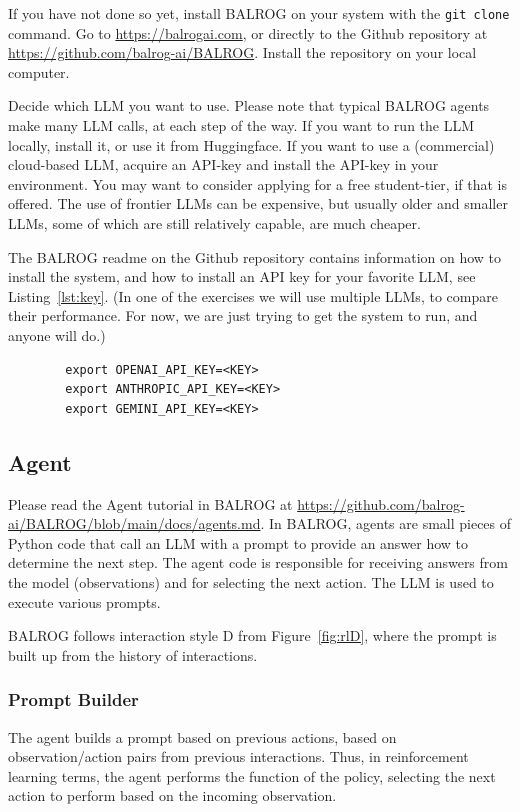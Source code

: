 If you have not done so yet, install BALROG on your system with the \verb|git clone| command.  
Go to \url{https://balrogai.com}, or directly to the Github repository at \url{https://github.com/balrog-ai/BALROG}. Install the repository on your local computer.

Decide which LLM you want to use. Please note that typical BALROG agents make many LLM calls, at each step of the way. If you want to run the LLM locally, install it, or use it from Huggingface. If you want to use a (commercial) cloud-based LLM, acquire an API-key and install the API-key in your environment. You may want to consider applying for a free student-tier, if that is offered. The use of frontier LLMs can be expensive, but usually older and smaller LLMs, some of which are still relatively capable, are much cheaper.

The BALROG readme on the Github repository contains information on how to install the system, and how to install an API key for your favorite LLM, see Listing~\ref{lst:key}. (In one of the exercises we will use multiple LLMs, to compare their performance. For now, we are just trying to get the system to run, and anyone will do.)
\begin{listing}
    \begin{verbatim}
        export OPENAI_API_KEY=<KEY>
        export ANTHROPIC_API_KEY=<KEY>
        export GEMINI_API_KEY=<KEY>
    \end{verbatim}
    \caption{Installing the API key}\label{lst:key}
\end{listing}

\subsection{Agent}
Please read the Agent tutorial in BALROG at \url{https://github.com/balrog-ai/BALROG/blob/main/docs/agents.md}. In BALROG, agents are small pieces of Python code that call  an LLM with a prompt to provide an answer how to determine the next step. The agent code is  responsible for receiving answers from the model (observations) and for  selecting the next action. The LLM is used to execute various prompts.  

BALROG follows interaction style D from Figure~\ref{fig:rlD},  where the prompt is built up from the history of interactions. 

\subsubsection{Prompt Builder}
The agent builds  a prompt based on previous actions, based on observation/action pairs from previous interactions. 
Thus, in reinforcement learning terms, the agent performs the function of the policy, selecting the next action to perform based on the incoming observation. 

